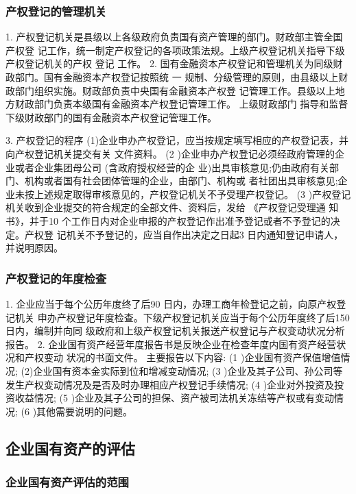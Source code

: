 \documentclass[UTF8,12pt]{ctexart}
\numberwithin{equation}{section} %
\numberwithin{figure}{section}
\numberwithin{table}{section}
\begin{document}
	\subsubsection{产权登记的管理机关}
	1. 产权登记机关是县级以上各级政府负责国有资产管理的部门。财政部主管全国产权登
	记工作，统一制定产权登记的各项政策法规。上级产权登记机关指导下级产权登记机关的产权
	登记 工作。
	2. 国有金融资本产权登记和管理机关为同级财政部门。国有金融资本产权登记按照统 一
	规制、分级管理的原则，由县级以上财政部门组织实施。财政部负责中央国有金融资本产权登
	记管理工作。县级以上地方财政部门负责本级国有金融资本产权登记管理工作。 上级财政部门
	指导和监督 下级财政部门的国有金融资本产权登记管理工作。
	
	3. 产权登记的程序
	(1)企业申办产权登记，应当按规定填写相应的产权登记表，并向产权登记机关提交有关
	文件资料。
	(2 )企业申办产权登记必须经政府管理的企业或者企业集团母公司 (含政府授权经营的企
	业)出具审核意见;仍由政府有关部门、机构或者国有社会团体管理的企业，由部门、机构或
	者社团出具审核意见;企业未按上述规定取得审核意见的，产权登记机关不予受理产权登记。
	(3 )产权登记机关收到企业提交的符合规定的全部文件、资料后，发给 《产权登记受理通
	知书》，并于10 个工作日内对企业申报的产权登记作出准予登记或者不予登记的决定。产权登
	记机关不予登记的，应当自作出决定之日起3 日内通知登记申请人，并说明原因。
	
	\subsubsection{产权登记的年度检查}
	1. 企业应当于每个公历年度终了后90 日内，办理工商年检登记之前，向原产权登记机关
	申办产权登记年度检查。下级产权登记机关应当于每个公历年度终了后150 日内，编制并向同
	级政府和上级产权登记机关报送产权登记与产权变动状况分析报告。
	2. 企业国有资产经营年度报告书是反映企业在检查年度内国有资产经营状况和产权变动
	状况的书面文件。 主要报告以下内容:
	(1 )企业国有资产保值增值情况;
	(2)企业国有资本金实际到位和增减变动情况;
	(3 )企业及其子公司、孙公司等发生产权变动情况及是否及时办理相应产权登记手续情况;
	(4 )企业对外投资及投资收益情况;
	(5 )企业及其子公司的担保、资产被司法机关冻结等产权或有变动情况;
	(6 )其他需要说明的问题。
	
	
	\subsection{企业国有资产的评估}
	
	\subsubsection{企业国有资产评估的范围}
	
\end{document}
